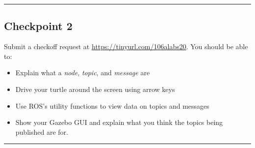 \documentclass{article}
\begin{document}
\begin{samepage}
\vspace{0.25in}
\noindent\rule{\columnwidth}{0.5pt}
\vspace{-0.15in}
\subsection*{Checkpoint 2}
Submit a checkoff request at \url{https://tinyurl.com/106alabs20}. You should be able to:
\begin{itemize}
\item Explain what a \emph{node}, \emph{topic}, and \emph{message} are
\item Drive your turtle around the screen using arrow keys
\item Use ROS's utility functions to view data on topics and messages
\item Show your Gazebo GUI and explain what you think the topics being published are for.
\end{itemize}

\noindent\rule{\columnwidth}{0.5pt}
\vspace{0.25in}
\end{samepage}
\end{document}
